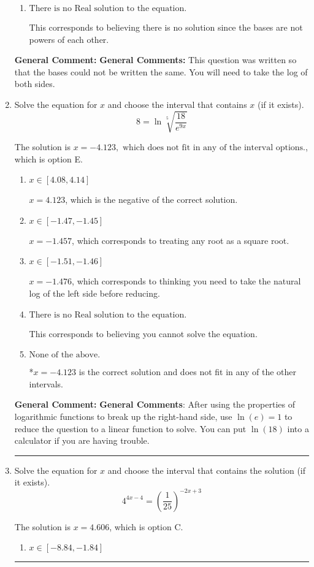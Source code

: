 \documentclass{extbook}[14pt]
\newcommand{\litem}[1]{\item #1

\rule{\textwidth}{0.4pt}}
\begin{document}
\begin{enumerate}
{\begin{enumerate}[label=\Alph*.]
* $x = -2.361$, which is the correct option.
\item \( \text{There is no Real solution to the equation.} \)

This corresponds to believing there is no solution since the bases are not powers of each other.
\end{enumerate}

\textbf{General Comment:} \textbf{General Comments:} This question was written so that the bases could not be written the same. You will need to take the log of both sides.
}
\litem{
 Solve the equation for $x$ and choose the interval that contains $x$ (if it exists).
\[  8 = \ln{\sqrt[5]{\frac{18}{e^{9x}}}} \]

The solution is \( x = -4.123, \text{ which does not fit in any of the interval options.} \), which is option E.\begin{enumerate}[label=\Alph*.]
\item \( x \in [4.08, 4.14] \)

$x = 4.123$, which is the negative of the correct solution.
\item \( x \in [-1.47, -1.45] \)

$x = -1.457$, which corresponds to treating any root as a square root.
\item \( x \in [-1.51, -1.46] \)

$x = -1.476$, which corresponds to thinking you need to take the natural log of the left side before reducing.
\item \( \text{There is no Real solution to the equation.} \)

This corresponds to believing you cannot solve the equation.
\item \( \text{None of the above.} \)

*$x = -4.123$ is the correct solution and does not fit in any of the other intervals.
\end{enumerate}

\textbf{General Comment:} \textbf{General Comments}: After using the properties of logarithmic functions to break up the right-hand side, use $\ln(e) = 1$ to reduce the question to a linear function to solve. You can put $\ln(18)$ into a calculator if you are having trouble.
}
\litem{
Solve the equation for $x$ and choose the interval that contains the solution (if it exists).
\[ 4^{4x-4} = \left(\frac{1}{25}\right)^{-2x+3} \]

The solution is \( x = 4.606 \), which is option C.\begin{enumerate}[label=\Alph*.]
\item \( x \in [-8.84, -1.84] \)


\end{enumerate}}
\end{enumerate}
\end{document}
